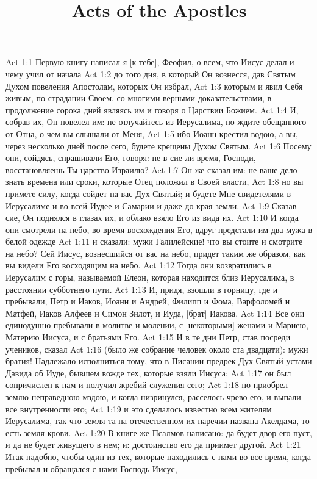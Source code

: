 

\title{Acts of the Apostles}

Act 1:1  Первую книгу написал я [к тебе], Феофил, о всем, что Иисус делал и чему учил от начала
Act 1:2  до того дня, в который Он вознесся, дав Святым Духом повеления Апостолам, которых Он избрал,
Act 1:3  которым и явил Себя живым, по страдании Своем, со многими верными доказательствами, в продолжение сорока дней являясь им и говоря о Царствии Божием.
Act 1:4  И, собрав их, Он повелел им: не отлучайтесь из Иерусалима, но ждите обещанного от Отца, о чем вы слышали от Меня,
Act 1:5  ибо Иоанн крестил водою, а вы, через несколько дней после сего, будете крещены Духом Святым.
Act 1:6  Посему они, сойдясь, спрашивали Его, говоря: не в сие ли время, Господи, восстановляешь Ты царство Израилю?
Act 1:7  Он же сказал им: не ваше дело знать времена или сроки, которые Отец положил в Своей власти,
Act 1:8  но вы примете силу, когда сойдет на вас Дух Святый; и будете Мне свидетелями в Иерусалиме и во всей Иудее и Самарии и даже до края земли.
Act 1:9  Сказав сие, Он поднялся в глазах их, и облако взяло Его из вида их.
Act 1:10  И когда они смотрели на небо, во время восхождения Его, вдруг предстали им два мужа в белой одежде
Act 1:11  и сказали: мужи Галилейские! что вы стоите и смотрите на небо? Сей Иисус, вознесшийся от вас на небо, придет таким же образом, как вы видели Его восходящим на небо.
Act 1:12  Тогда они возвратились в Иерусалим с горы, называемой Елеон, которая находится близ Иерусалима, в расстоянии субботнего пути.
Act 1:13  И, придя, взошли в горницу, где и пребывали, Петр и Иаков, Иоанн и Андрей, Филипп и Фома, Варфоломей и Матфей, Иаков Алфеев и Симон Зилот, и Иуда, [брат] Иакова.
Act 1:14  Все они единодушно пребывали в молитве и молении, с [некоторыми] женами и Мариею, Материю Иисуса, и с братьями Его.
Act 1:15  И в те дни Петр, став посреди учеников, сказал
Act 1:16  (было же собрание человек около ста двадцати): мужи братия! Надлежало исполниться тому, что в Писании предрек Дух Святый устами Давида об Иуде, бывшем вожде тех, которые взяли Иисуса;
Act 1:17  он был сопричислен к нам и получил жребий служения сего;
Act 1:18  но приобрел землю неправедною мздою, и когда низринулся, расселось чрево его, и выпали все внутренности его;
Act 1:19  и это сделалось известно всем жителям Иерусалима, так что земля та на отечественном их наречии названа Акелдама, то есть земля крови.
Act 1:20  В книге же Псалмов написано: да будет двор его пуст, и да не будет живущего в нем; и: достоинство его да приимет другой.
Act 1:21  Итак надобно, чтобы один из тех, которые находились с нами во все время, когда пребывал и обращался с нами Господь Иисус,
